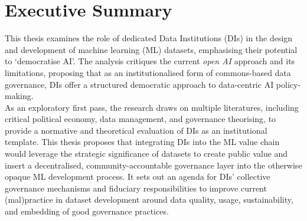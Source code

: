 \chapter*{Executive Summary}

\begin{tcolorbox}
    This thesis examines the role of dedicated Data Institutions (DIs) in the design and development of machine learning (ML) datasets, emphasising their potential to `democratise AI'. The analysis critiques the current \textit{open AI} approach and its limitations, proposing that as an institutionalised form of commons-based data governance, DIs offer a structured democratic approach to data-centric AI policy-making. \\

    As an exploratory first pass, the research draws on multiple literatures, including critical political economy, data management, and governance theorising, to provide a normative and theoretical evaluation of DIs as an institutional template. This thesis proposes that integrating DIs into the ML value chain would leverage the strategic significance of datasets to create public value and insert a decentralised, community-accountable governance layer into the otherwise opaque ML development process. It sets out an agenda for DIs' collective governance mechanisms and fiduciary responsibilities to improve current (mal)practice in dataset development around data quality, usage, sustainability, and embedding of good governance practices.
\end{tcolorbox}